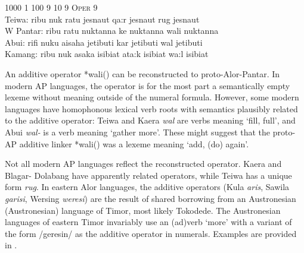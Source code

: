 \let\eachwordone=\rm
\let\eachwordtwo=\it
\let\eachwordthree=\it
\let\eachwordfour=\it
\let\eachwordfive=\it 

\ea%
\label{ex:6:15} 
\glllll  {}     1000  1  100  9  10  9  \textsc{Oper}  9\\
  {\rm Teiwa:}  ribu   nuk  ratu  jesna{\textglotstop}ut  qa:r  jesna{\textglotstop}ut  rug  jesna{\textglotstop}ut\\
  {\rm W Pantar:} ribu {}   ratu  nuktanna{\ng}  ke nuktanna{\ng} wali  nuktanna{\ng}\\
  {\rm Abui:}  	rifi   nuku  aisaha  jeti{\ng}buti  kar  jeti{\ng}buti  wal  jeti{\ng}buti\\
  {\rm Kamang:}	ribu   nuk  asaka  isi{\ng}biat  ata:k  isi{\ng}biat  wa:l  isi{\ng}biat\\
\z


\let\eachwordone=\it
\let\eachwordtwo=\rm
\let\eachwordthree=\rm
\let\eachwordfour=\rm
\let\eachwordfive=\rm 

An additive operator *wali({\ng}) can be reconstructed to proto-Alor-Pantar. In modern AP languages, the operator is for the most part a semantically empty lexeme without meaning outside of the numeral formula. However, some modern languages have homophonous lexical verb roots with semantics plausibly related to the additive operator: Teiwa and Kaera \textit{wal} are verbs meaning `fill, full', and Abui \textit{wal-} is a verb meaning `gather more'. These might suggest that the proto-AP additive linker *wali({\ng}) was a lexeme meaning `add, (do) again'. 

Not all modern AP languages reflect the reconstructed operator. Kaera and Blagar- Dolabang have apparently related operators, while Teiwa has a unique form \textit{rug}. In eastern Alor languages, the additive operators (Kula \textit{aris}\textit{{\textbari}}\textit{{\ng}}, Sawila \textit{garisi{\ng}}, Wersing \textit{weresi{\ng}}) are the result of shared borrowing from an Austronesian (Austronesian) language of Timor, most likely Tokodede. The Austronesian languages of eastern Timor invariably use an (ad)verb `more' with a variant of the form /geresin/ as the additive operator in numerals. Examples are provided in .   




